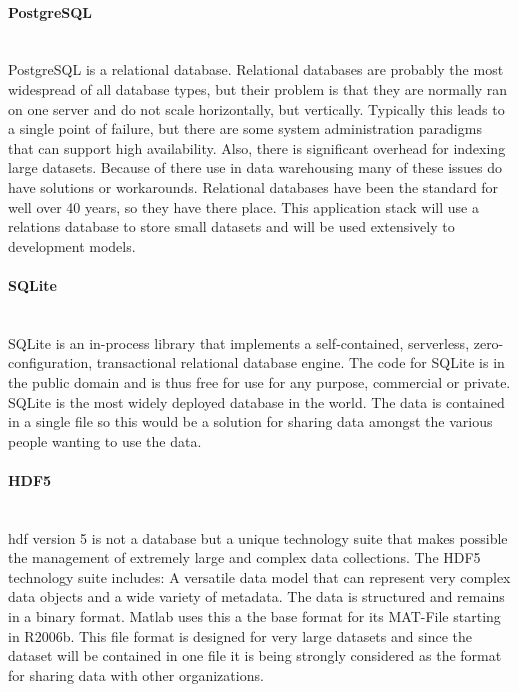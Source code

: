 {\Huge{{\color{red}{~\\Proofread Completed}}}}

\paragraph{PostgreSQL} ~\\
PostgreSQL is a relational database.  Relational databases are probably the most widespread of all database types, but their problem is that they are normally ran on one server and do not scale horizontally, but vertically. Typically this leads to a single point of failure, but there are some system administration paradigms that can support high availability. Also, there is significant overhead for indexing large datasets.  Because of there use in data warehousing many of these issues do have solutions or workarounds. Relational databases have been the standard for well over 40 years, so they have there place.  This application stack will use a relations database to store small datasets and will be used extensively to development models.

\paragraph{SQLite} ~\\
SQLite is an in-process library that implements a self-contained, serverless, zero-configuration, transactional relational database engine. The code for SQLite is in the public domain and is thus free for use for any purpose, commercial or private. SQLite is the most widely deployed database in the world. The data is contained in a single file so this would be a solution for sharing data amongst the various people wanting to use the data.

\paragraph{HDF5} ~\\
\ac{hdf} version 5 is not a database but a unique technology suite that makes possible the management of extremely large and complex data collections. The HDF5 technology suite includes: A versatile data model that can represent very complex data objects and a wide variety of metadata. The data is structured and remains in a binary format.  Matlab uses this a the base format for its MAT-File starting in R2006b. This file format is designed for very large datasets and since the dataset will be contained in one file it is being strongly considered as the format for sharing data with other organizations.

